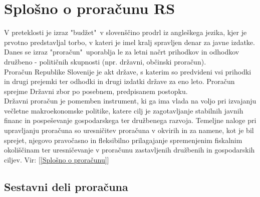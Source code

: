\documentclass[12pt, a4paper]{article}
\begin{document}
\section[Splošno o proračunu RS]{Splošno o proračunu RS}
\hspace*{5mm} V preteklosti je izraz "budžet"~v slovenščino prodrl iz angleškega jezika, kjer je prvotno predstavljal torbo, v kateri je imel kralj spravljen denar za javne izdatke. \\
\hspace*{5mm} Danes se izraz "proračun"~uporablja le za letni načrt prihodkov in odhodkov družbeno - političnih skupnosti (npr. državni, občinski proračun).\\
\hspace*{5mm}
Proračun Republike Slovenije je akt države, s katerim so predvideni vsi prihodki in drugi prejemki ter odhodki in drugi izdatki države za eno leto. Proračun sprejme Državni zbor po posebnem, predpisanem postopku.\\
\hspace*{5mm}
Državni proračun je pomemben instrument, ki ga ima vlada na voljo pri izvajanju večletne makroekonomske politike, katere cilj je zagotavljanje stabilnih javnih financ in pospeševanje gospodarskega ter družbenega razvoja. Temeljne naloge pri upravljanju proračuna so uresničitev proračuna v okvirih in za namene, kot je bil sprejet, njegovo pravočasno in fleksibilno prilagajanje spremenjenim fiskalnim okoliščinam ter uresničevanje v proračunu zastavljenih družbenih in gospodarskih ciljev. Vir: [\ref{Splošno o proračunu}]

\subsection[Sestavni deli proračuna]{Sestavni deli proračuna}
\end{document}
